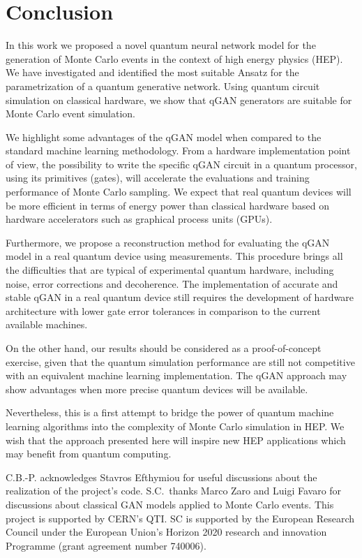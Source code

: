 \documentclass[twocolumn,preprintnumbers,superscriptaddress]{revtex4-2}
\begin{document}
\section{Conclusion}
\label{sec:conclusion}

In this work we proposed a novel quantum neural network model for the generation
of Monte Carlo events in the context of high energy physics (HEP). We have
investigated and identified the most suitable Ansatz for the parametrization of
a quantum generative network. Using quantum circuit simulation on classical
hardware, we show that qGAN generators are suitable for Monte Carlo event
simulation.

We highlight some advantages of the qGAN model when compared to the standard
machine learning methodology. From a hardware implementation point of view, the
possibility to write the specific qGAN circuit in a quantum processor, using its
primitives (gates), will accelerate the evaluations and training performance of
Monte Carlo sampling. We expect that real quantum devices will be more efficient
in terms of energy power than classical hardware based on hardware accelerators
such as graphical process units (GPUs).

Furthermore, we propose a reconstruction method for evaluating the qGAN model in
a real quantum device using measurements. This procedure brings all the
difficulties that are typical of experimental quantum hardware, including noise,
error corrections and decoherence. The implementation of accurate and stable
qGAN in a real quantum device still requires the development of hardware
architecture with lower gate error tolerances in comparison to the current
available machines.

On the other hand, our results should be considered as a proof-of-concept
exercise, given that the quantum simulation performance are still not
competitive with an equivalent machine learning implementation. The qGAN
approach may show advantages when more precise quantum devices will be
available.

Nevertheless, this is a first attempt to bridge the power of quantum machine
learning algorithms into the complexity of Monte Carlo simulation in HEP. We
wish that the approach presented here will inspire new HEP applications which
may benefit from quantum computing.

\acknowledgments

C.B.-P. acknowledges Stavros Efthymiou for useful discussions about the realization of the project's code. S.C.~thanks Marco Zaro and Luigi
Favaro for discussions about classical GAN models applied to Monte Carlo events. This project is supported by CERN's QTI. SC is supported by the European
Research Council under the European Union's Horizon 2020 research and innovation
Programme (grant agreement number 740006).


\end{document}

